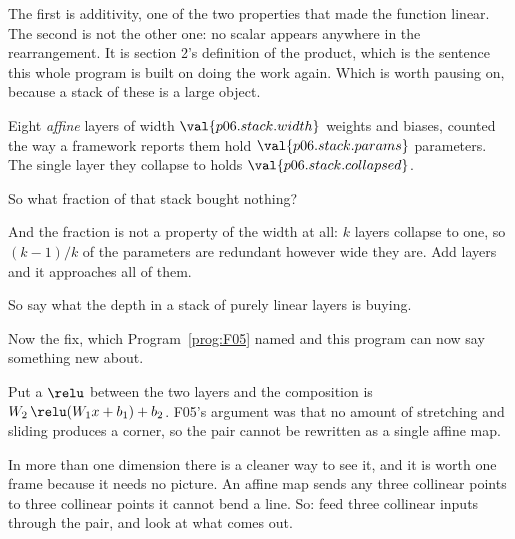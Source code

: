 \begin{fr}
The first is additivity, one of the two properties that made the function
linear. The second is not the other one: no scalar appears anywhere in the
rearrangement. It is section 2's definition of the product, which is the
sentence this whole program is built on doing the work again.
Which is worth pausing on, because a stack of these is a large object.

Eight \emph{affine} layers of width $\val{p06.stack.width}$ \dash{} weights and
biases, counted the way a framework reports them \dash{} hold
$\val{p06.stack.params}$ parameters. The single layer they collapse to holds
$\val{p06.stack.collapsed}$.

So what fraction of that stack bought nothing?
\nextframe
\end{fr}

\begin{fr}
And the fraction is not a property of the width at all: $k$ layers collapse to
one, so $(k-1)/k$ of the parameters are redundant however wide they are. Add
layers and it approaches all of them.

So say what the depth in a stack of purely linear layers is buying.
\dotline
\nextframe
\end{fr}

\begin{fr}
Now the fix, which Program~\ref{prog:F05} named and this program can now say
something new about.

Put a $\relu$ between the two layers and the composition is
$W_2\,\relu(W_1x + b_1) + b_2$. F05's argument was that no amount of stretching
and sliding produces a corner, so the pair cannot be rewritten as a single
affine map.

In more than one dimension there is a cleaner way to see it, and it is worth
one frame because it needs no picture. An affine map sends any three collinear
points to three collinear points \dash{} it cannot bend a line. So: feed three
collinear inputs through the pair, and look at what comes out.
\nextframe
\end{fr}

